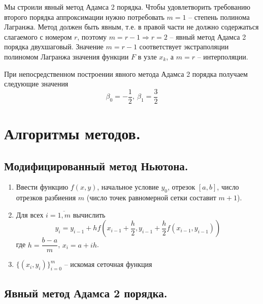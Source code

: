 \documentclass[a4paper, 12pt]{article}
\begin{document}
	Мы строили явный метод Адамса 2 порядка. Чтобы удовлетворить требованию второго порядка аппроксимации нужно потребовать $m=1$ -- степень полинома Лагранжа. Метод должен быть явным, т.е. в правой части не должно содержаться слагаемого с номером $r$, поэтому $m=r-1\Rightarrow r=2$ -- явный метод Адамса 2 порядка двухшаговый. Значение $m=r-1$ соответствует экстраполяции полиномом Лагранжа значения функции $F$ в узле $x_k$, а $m=r$ -- интерполяции.
	
	При непосредственном построении явного метода Адамса 2 порядка получаем следующие значения
	\begin{equation}
		\beta_0 = -\dfrac{1}{2},\ \beta_1 = \dfrac{3}{2}
	\end{equation}

	\section{Алгоритмы методов.}
	
	\subsection{Модифицированный метод Ньютона.}
	
	\begin{enumerate}
		\item Ввести функцию $f(x,y)$, начальное условие $y_0$, отрезок $[a,b]$, число отрезков разбиения $m$ (число точек равномерной сетки составит $m+1$).
		\item Для всех $i=\overline{1,m}$ вычислить
		\begin{equation} \label{euler_method}
			y_i = y_{i-1} + hf(x_{i-1} + \frac{h}{2}, y_{i-1}+\frac{h}{2}f(x_{i-1},y_{i-1}))
		\end{equation}
		где $h=\dfrac{b-a}{m}$, $x_i=a+ih$.
		\item $\{(x_i,y_i)\}_{i=0}^m$ -- искомая сеточная функция
	\end{enumerate}

	\subsection{Явный метод Адамса 2 порядка.}
	
\end{document}
